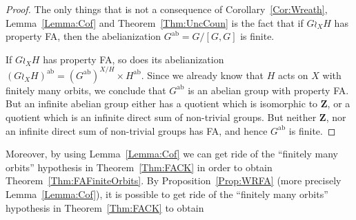 \documentclass[a4paper]{article}
\newtheorem{thm}[lem]{Theorem}
\theoremstyle{definition}
\DeclareMathOperator\ab{ab}
\newcommand*{\field}[1]{\mathbf{#1}}
\newcommand*{\Z}{\field{Z}}
\begin{document}
\begin{proof}
The only things that is not a consequence of Corollary~\ref{Cor:Wreath}, Lemma~\ref{Lemma:Cof} and Theorem~\ref{Thm:UncCoun} is the fact that if $G\wr_XH$ has property FA, then the abelianization $G^{\ab}=G/[G,G]$ is finite.

If $G\wr_XH$ has property FA, so does its abelianization $(G\wr_XH)^{\ab}=(G^{\ab})^{X/H}\times H^{\ab}$. Since we already know that $H$ acts on $X$ with finitely many orbits, we conclude that $G^{\ab}$ is an abelian group with property FA.
But an infinite abelian group either has a quotient which is isomorphic to $\Z$, or a quotient which is an infinite direct sum of non-trivial groups.
But neither $\Z$, nor an infinite direct sum of non-trivial groups has FA, and hence $G^{\ab}$ is finite.
\end{proof}
%
%
%
%
Moreover, by using Lemma~\ref{Lemma:Cof} we can get ride of the ``finitely many orbits'' hypothesis in Theorem~\ref{Thm:FACK} in order to obtain Theorem~\ref{Thm:FAFiniteOrbits}.
By Proposition~\ref{Prop:WRFA} (more precisely Lemma~\ref{Lemma:Cof}), it is possible to get ride of the ``finitely many orbits'' hypothesis in Theorem~\ref{Thm:FACK} to obtain
\end{document}
